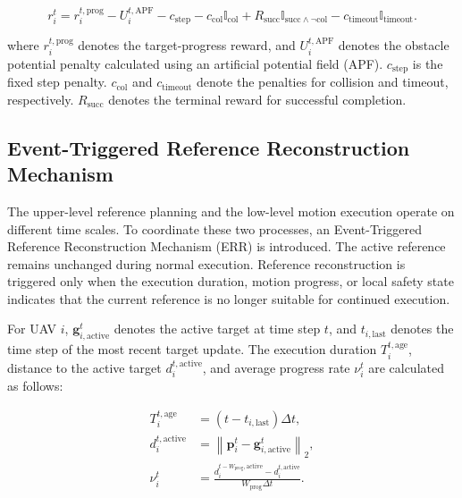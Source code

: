 \begin{equation}
    \label{eq:low_level_reward}
    r_i^t
    =
    r_i^{t,\mathrm{prog}}
    -
    U_i^{t,\mathrm{APF}}
    -
    c_{\mathrm{step}}
    -
    c_{\mathrm{col}}\mathbb{I}_{\mathrm{col}}
    +
    R_{\mathrm{succ}}
    \mathbb{I}_{\mathrm{succ}\land\neg\mathrm{col}}
    -
    c_{\mathrm{timeout}}\mathbb{I}_{\mathrm{timeout}} .
\end{equation}

\noindent
where $r_i^{t,\mathrm{prog}}$ denotes the target-progress reward, and $U_i^{t,\mathrm{APF}}$ denotes the obstacle potential penalty calculated using an artificial potential field (APF). $c_{\mathrm{step}}$ is the fixed step penalty. $c_{\mathrm{col}}$ and $c_{\mathrm{timeout}}$ denote the penalties for collision and timeout, respectively. $R_{\mathrm{succ}}$ denotes the terminal reward for successful completion.

\subsection{Event-Triggered Reference Reconstruction Mechanism}

The upper-level reference planning and the low-level motion execution operate on different time scales. To coordinate these two processes, an Event-Triggered Reference Reconstruction Mechanism (ERR) is introduced. The active reference remains unchanged during normal execution. Reference reconstruction is triggered only when the execution duration, motion progress, or local safety state indicates that the current reference is no longer suitable for continued execution.

For UAV $i$, $\mathbf g_{i,\mathrm{active}}^t$ denotes the active target at time step $t$, and $t_{i,\mathrm{last}}$ denotes the time step of the most recent target update. The execution duration $T_i^{t,\mathrm{age}}$, distance to the active target $d_i^{t,\mathrm{active}}$, and average progress rate $\nu_i^t$ are calculated as follows:

\begin{equation}
    \label{eq:reference_execution_state}
    \begin{aligned}
        T_i^{t,\mathrm{age}}
        &=
        (t-t_{i,\mathrm{last}})\Delta t,\\
        d_i^{t,\mathrm{active}}
        &=
        \left\|
        \mathbf p_i^t-\mathbf g_{i,\mathrm{active}}^t
        \right\|_2,\\
        \nu_i^t
        &=
        \frac{
        d_i^{t-W_{\mathrm{prog}},\mathrm{active}}
        -
        d_i^{t,\mathrm{active}}
        }{
        W_{\mathrm{prog}}\Delta t
        }.
    \end{aligned}
\end{equation}

